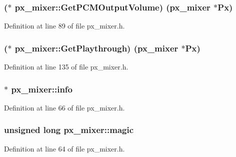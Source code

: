 \subsubsection[{\texorpdfstring{Get\+P\+C\+M\+Output\+Volume}{GetPCMOutputVolume}}]{($\ast$ px\+\_\+mixer\+::\+Get\+P\+C\+M\+Output\+Volume) ({\bf px\+\_\+mixer} $\ast$Px)}\hypertarget{structpx__mixer_af4892808cf773676fcb91da69701da40}{}\label{structpx__mixer_af4892808cf773676fcb91da69701da40}


Definition at line 89 of file px\+\_\+mixer.\+h.

\subsubsection[{\texorpdfstring{Get\+Playthrough}{GetPlaythrough}}]{($\ast$ px\+\_\+mixer\+::\+Get\+Playthrough) ({\bf px\+\_\+mixer} $\ast$Px)}\hypertarget{structpx__mixer_a25362265d1607b75ec6a3b0da6fac694}{}\label{structpx__mixer_a25362265d1607b75ec6a3b0da6fac694}


Definition at line 135 of file px\+\_\+mixer.\+h.

\subsubsection[{\texorpdfstring{info}{info}}]{$\ast$ px\+\_\+mixer\+::info}\hypertarget{structpx__mixer_a9ee425600125f7a11e386c15b96707ab}{}\label{structpx__mixer_a9ee425600125f7a11e386c15b96707ab}


Definition at line 66 of file px\+\_\+mixer.\+h.

\subsubsection[{\texorpdfstring{magic}{magic}}]{\setlength{\rightskip}{0pt plus 5cm}unsigned long px\+\_\+mixer\+::magic}\hypertarget{structpx__mixer_a4fd07c2c6246525809f464a965d22669}{}\label{structpx__mixer_a4fd07c2c6246525809f464a965d22669}


Definition at line 64 of file px\+\_\+mixer.\+h.

